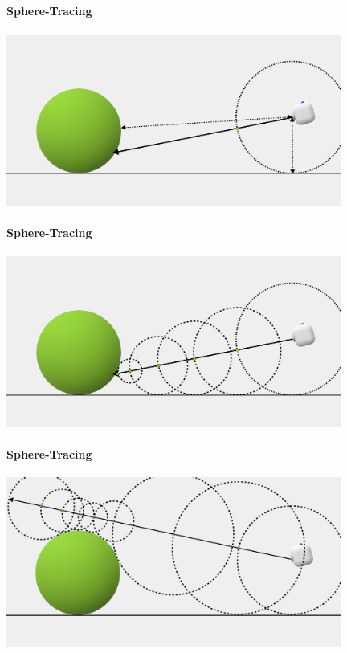 \begin{frame}{\insertsectionhead}
\framesubtitle{Sphere-Tracing}

\centering\includegraphics[width=11cm]{screenshots/ST-2.png}
    
\end{frame}

\begin{frame}{\insertsectionhead}
\framesubtitle{Sphere-Tracing}

\centering\includegraphics[width=11cm]{screenshots/ST-3.png}
    
\end{frame}

\begin{frame}{\insertsectionhead}
\framesubtitle{Sphere-Tracing}

\centering\includegraphics[width=11cm]{screenshots/ST-Miss.png}
    
\end{frame}

